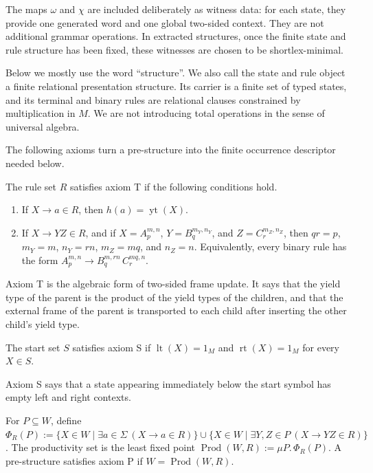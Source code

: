 \documentclass[sub]{jalc}
\newcommand{\yt}{\operatorname{yt}}
\newcommand{\lt}{\operatorname{lt}}
\newcommand{\rt}{\operatorname{rt}}
\newcommand{\eM}{1_M}
\newcommand{\Prod}{\operatorname{Prod}}
\begin{document}
The maps \(\omega\) and \(\chi\) are included deliberately as witness data: for each state, they provide one generated word and one global two-sided context. They are not additional grammar operations. In extracted structures, once the finite state and rule structure has been fixed, these witnesses are chosen to be shortlex-minimal.

Below we mostly use the word ``structure''. We also call the state and rule object a finite relational presentation structure. Its carrier is a finite set of typed states, and its terminal and binary rules are relational clauses constrained by multiplication in \(M\). We are not introducing total operations in the sense of universal algebra.

The following axioms turn a pre-structure into the finite occurrence descriptor needed below.

\begin{definition}
\label{def:axiom-T}
The rule set \(R\) satisfies axiom T if the following conditions hold.
\begin{enumerate}[label=\textup{(\roman*)},leftmargin=2.2em]
\item If \(X\to a\in R\), then \(h(a)=\yt(X)\).
\item If \(X\to YZ\in R\), and if \(X=A_p^{m,n}\), \(Y=B_q^{m_Y,n_Y}\), and \(Z=C_r^{m_Z,n_Z}\), then \(qr=p\), \(m_Y=m\), \(n_Y=rn\), \(m_Z=mq\), and \(n_Z=n\). Equivalently, every binary rule has the form \(A_p^{m,n}\to B_q^{m,rn}\,C_r^{mq,n}\).
\end{enumerate}
\end{definition}

Axiom T is the algebraic form of two-sided frame update. It says that the yield type of the parent is the product of the yield types of the children, and that the external frame of the parent is transported to each child after inserting the other child's yield type.

\begin{definition}
\label{def:axiom-S}
The start set \(S\) satisfies axiom S if \(\lt(X)=\eM\) and \(\rt(X)=\eM\) for every \(X\in S\).
\end{definition}

Axiom S says that a state appearing immediately below the start symbol has empty left and right contexts.

\begin{definition}
\label{def:productivity-fixed-point}
For \(P\subseteq W\), define \(\Phi_R(P):=\{X\in W\mid \exists a\in\Sigma\ (X\to a\in R)\}\cup\{X\in W\mid \exists Y,Z\in P\ (X\to YZ\in R)\}\). The productivity set is the least fixed point \(\Prod(W,R):=\mu P.\,\Phi_R(P)\). A pre-structure satisfies axiom P if \(W=\Prod(W,R)\).
\end{definition}
\end{document}
